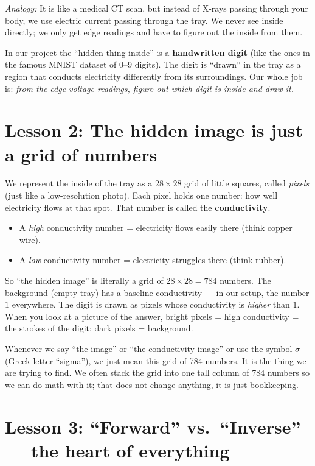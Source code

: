 \documentclass[11pt]{article}
\newcommand{\analogy}[1]{\par\smallskip\noindent\textit{Analogy:} #1\par\smallskip}
\begin{document}
\analogy{It is like a medical CT scan, but instead of X-rays passing through
your body, we use electric current passing through the tray. We never see
inside directly; we only get edge readings and have to figure out the inside
from them.}

In our project the ``hidden thing inside'' is a \textbf{handwritten digit}
(like the ones in the famous MNIST dataset of 0--9 digits). The digit is
``drawn'' in the tray as a region that conducts electricity differently from
its surroundings. Our whole job is: \emph{from the edge voltage readings,
figure out which digit is inside and draw it.}

\section{Lesson 2: The hidden image is just a grid of numbers}

We represent the inside of the tray as a $28\times28$ grid of little squares,
called \emph{pixels} (just like a low-resolution photo). Each pixel holds one
number: how well electricity flows at that spot. That number is called the
\textbf{conductivity}.

\begin{itemize}[leftmargin=2em]
\item A \emph{high} conductivity number = electricity flows easily there
(think copper wire).
\item A \emph{low} conductivity number = electricity struggles there
(think rubber).
\end{itemize}

So ``the hidden image'' is literally a grid of $28\times28 = 784$ numbers. The
background (empty tray) has a baseline conductivity --- in our setup, the
number $1$ everywhere. The digit is drawn as pixels whose conductivity is
\emph{higher} than $1$. When you look at a picture of the answer, bright
pixels = high conductivity = the strokes of the digit; dark pixels =
background.

\begin{intuition}
Whenever we say ``the image'' or ``the conductivity image'' or use the symbol
$\sigma$ (Greek letter ``sigma''), we just mean this grid of 784 numbers. It
is the thing we are trying to find. We often stack the grid into one tall
column of 784 numbers so we can do math with it; that does not change
anything, it is just bookkeeping.
\end{intuition}

\section{Lesson 3: ``Forward'' vs.\ ``Inverse'' --- the heart of everything}
\end{document}
